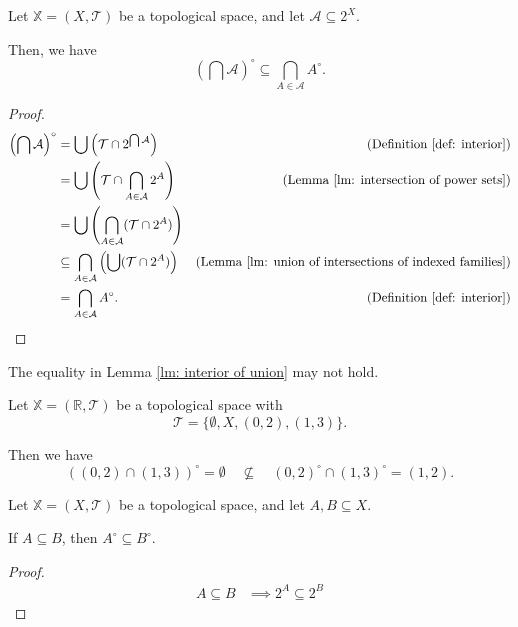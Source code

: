 \begin{lemma}
	\label{lm: interior of union}
	Let $\mathbb X = (X, \mathcal T)$ be a topological space, and let $\mathcal A \subseteq 2^X$.
	
	Then, we have
	$$
	\left( \bigcap \mathcal A \right)^\circ \subseteq \bigcap_{A \in \mathcal A} A^\circ.
	$$
	
	\begin{proof}
		$$
		\begin{aligned}
			\left( \bigcap \mathcal A \right)^\circ &= \bigcup \left(\mathcal T \cap 2^{\bigcap \mathcal A}\right)
			& \text{(Definition \ref{def: interior})}
			\\
			&= \bigcup \left( \mathcal T \cap \bigcap_{A \in \mathcal A} 2^A \right)
			& \text{(Lemma \ref{lm: intersection of power sets})}
			\\
			&= \bigcup \left( \bigcap_{A \in \mathcal A} (\mathcal T \cap 2^A) \right) \\
			&\subseteq \bigcap_{A \in \mathcal A} \left( \bigcup (\mathcal T \cap 2^A) \right) 
			&\text{(Lemma \ref{lm: union of intersections of indexed families})}
			\\
			&= \bigcap_{A \in \mathcal A} A^\circ.
			&\text{(Definition \ref{def: interior})}
		\end{aligned}
		$$
	\end{proof}
\end{lemma}


\begin{note}
	The equality in Lemma \ref{lm: interior of union} may not hold.
	
	Let $\mathbb X = (\mathbb R, \mathcal T)$ be a topological space with
	$$
	\mathcal T = \{\emptyset, X, (0,2), (1,3)\}.
	$$
	
	Then we have
	$$
	((0,2) \cap (1,3))^\circ = \emptyset \quad \not \subseteq \quad (0, 2)^\circ \cap (1, 3)^\circ = (1,2).
	$$
\end{note}


\begin{lemma}
	Let $\mathbb X = (X, \mathcal T)$ be a topological space, and let $A, B \subseteq X$.
	
	If $A \subseteq B$, then $A^\circ \subseteq B^\circ$.
	
	\begin{proof}
		$$
		\begin{aligned}
			A \subseteq B &\implies 2^A \subseteq 2^B
		\end{aligned}
		$$
	\end{proof}
\end{lemma}


